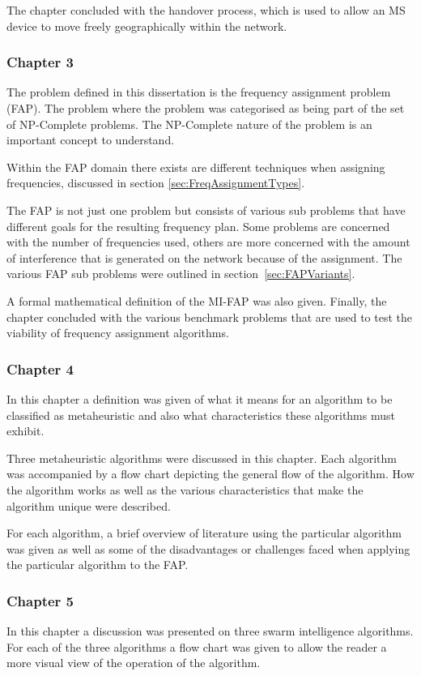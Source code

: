 The chapter concluded with the handover process, which is used to allow an MS device to move freely geographically within the network. 
\subsubsection{Chapter 3}
The problem defined in this dissertation is the frequency assignment problem (FAP). The problem where the problem was categorised as being part of the set of NP-Complete problems. The NP-Complete nature of the problem is an important concept to understand.

Within the FAP domain there exists are different techniques when assigning frequencies, discussed in section \ref{sec:FreqAssignmentTypes}. 

The FAP is not just one problem but consists of various sub problems that have different goals for the resulting frequency plan. Some problems are concerned with the number of frequencies used, others are more concerned with the amount of interference that is generated on the network because of the assignment. The various FAP sub problems were outlined in section~\ref{sec:FAPVariants}.

A formal mathematical definition of the MI-FAP was also given. Finally, the chapter concluded with the various benchmark problems that are used to test the viability of frequency assignment algorithms.
\subsubsection{Chapter 4}
In this chapter a definition was given of what it means for an algorithm to be classified as metaheuristic and also what characteristics these algorithms must exhibit.

Three metaheuristic algorithms were discussed in this chapter. Each algorithm was accompanied by a flow chart depicting the general flow of the algorithm. How the algorithm works as well as the various characteristics that make the algorithm unique were described.

For each algorithm, a brief overview of literature using the particular algorithm was given as well as some of the disadvantages or challenges faced when applying the particular algorithm to the FAP.

\subsubsection{Chapter 5}
In this chapter a discussion was presented on three swarm intelligence algorithms. For each of the three algorithms a flow chart was given to allow the reader a more visual view of the operation of the algorithm. 

